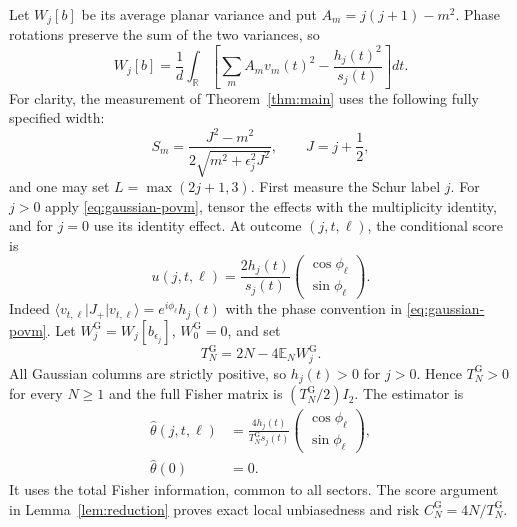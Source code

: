 \documentclass[aps,pra,reprint,superscriptaddress]{revtex4-2}
\theoremstyle{remark}
\newcommand{\E}{\mathbb E}
\newcommand{\R}{\mathbb R}
\newcommand{\ket}[1]{\lvert#1\rangle}
\newcommand{\bra}[1]{\langle#1\rvert}
\newcommand{\g}{\mathrm G}
\begin{document}
Let $W_j[b]$ be its average planar variance and put
$A_m=j(j+1)-m^2$. Phase rotations preserve the sum of the two
variances, so
\begin{equation}
 W_j[b]=\frac1d\int_\R
 \left[\sum_m A_m v_m(t)^2-\frac{h_j(t)^2}{s_j(t)}\right]dt.
 \label{eq:W}
\end{equation}
For clarity, the measurement of Theorem~\ref{thm:main} uses the
following fully specified width:
\begin{equation}
 S_m=\frac{J^2-m^2}{2\sqrt{m^2+\epsilon_j^2J^2}},\qquad
 J=j+\frac12,
 \label{eq:explicit-width}
\end{equation}
and one may set $L=\max(2j+1,3)$. First measure the Schur label $j$.
For $j>0$ apply \eqref{eq:gaussian-povm}, tensor the effects with
the multiplicity identity, and for $j=0$ use its identity effect.
At outcome $(j,t,\ell)$, the conditional score is
\begin{equation}
 u(j,t,\ell)=\frac{2h_j(t)}{s_j(t)}
 \begin{pmatrix}\cos\phi_\ell\\ \sin\phi_\ell\end{pmatrix}.
 \label{eq:score}
\end{equation}
Indeed $\bra{v_{t,\ell}}J_+\ket{v_{t,\ell}}=e^{i\phi_\ell}h_j(t)$
with the phase convention in \eqref{eq:gaussian-povm}.
Let $W_j^{\g}=W_j[b_{\epsilon_j}]$, $W_0^{\g}=0$, and set
\begin{equation}
 T_N^{\g}=2N-4\E_NW_j^{\g}.
 \label{eq:TN}
\end{equation}
All Gaussian columns are strictly positive, so $h_j(t)>0$ for
$j>0$. Hence $T_N^{\g}>0$ for every $N\geq1$ and the full Fisher
matrix is $(T_N^{\g}/2)I_2$. The estimator is
\begin{equation}
\begin{aligned}
\widehat\theta(j,t,\ell)&=
\frac{4h_j(t)}{T_N^{\g}s_j(t)}
\begin{pmatrix}\cos\phi_\ell\\ \sin\phi_\ell\end{pmatrix},\\
\widehat\theta(0)&=0.
\end{aligned}
\label{eq:estimator}
\end{equation}
It uses the total Fisher information, common to all sectors. The
score argument in Lemma~\ref{lem:reduction} proves exact local
unbiasedness and risk $C_N^{\g}=4N/T_N^{\g}$.
\end{document}
